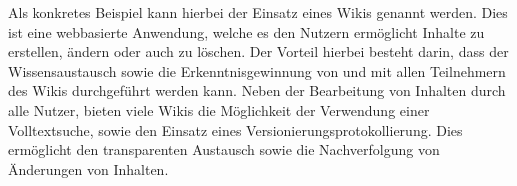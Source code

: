Als konkretes Beispiel kann hierbei der Einsatz eines Wikis genannt werden. Dies ist eine webbasierte Anwendung, welche es den Nutzern ermöglicht Inhalte zu erstellen, ändern oder auch zu löschen. Der Vorteil hierbei besteht darin, dass der Wissensaustausch sowie die Erkenntnisgewinnung von und mit allen Teilnehmern des Wikis durchgeführt werden kann. Neben der Bearbeitung von Inhalten durch alle Nutzer, bieten viele Wikis die Möglichkeit der Verwendung einer Volltextsuche, sowie den Einsatz eines Versionierungsprotokollierung. Dies ermöglicht den transparenten Austausch sowie die Nachverfolgung von Änderungen von Inhalten. \cite[S. 75f.]{Mertins.2009}

